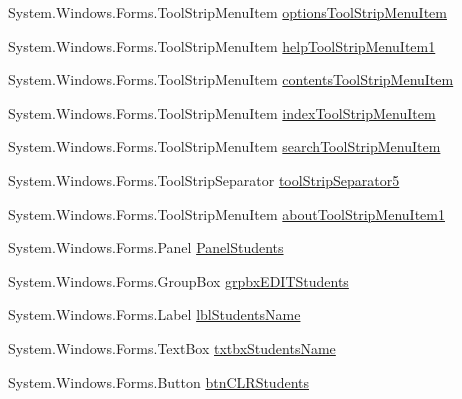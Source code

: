 \begin{DoxyCompactItemize}
\item 
\-System.\-Windows.\-Forms.\-Tool\-Strip\-Menu\-Item \hyperlink{class_sr_p___classroom_inq_1_1frm_classrrom_inq_acdc1111ba8acc3bb1ee140845f069521}{options\-Tool\-Strip\-Menu\-Item}
\item 
\-System.\-Windows.\-Forms.\-Tool\-Strip\-Menu\-Item \hyperlink{class_sr_p___classroom_inq_1_1frm_classrrom_inq_a09bf82e0de8e7288e39988c7bfc5f5e7}{help\-Tool\-Strip\-Menu\-Item1}
\item 
\-System.\-Windows.\-Forms.\-Tool\-Strip\-Menu\-Item \hyperlink{class_sr_p___classroom_inq_1_1frm_classrrom_inq_ac8e6b07efe8b6fe7e1a82d326648f88e}{contents\-Tool\-Strip\-Menu\-Item}
\item 
\-System.\-Windows.\-Forms.\-Tool\-Strip\-Menu\-Item \hyperlink{class_sr_p___classroom_inq_1_1frm_classrrom_inq_a650650a8a1948b902bae347f3cdf9679}{index\-Tool\-Strip\-Menu\-Item}
\item 
\-System.\-Windows.\-Forms.\-Tool\-Strip\-Menu\-Item \hyperlink{class_sr_p___classroom_inq_1_1frm_classrrom_inq_aa54fbd91dddb42716ec00341ee7ac713}{search\-Tool\-Strip\-Menu\-Item}
\item 
\-System.\-Windows.\-Forms.\-Tool\-Strip\-Separator \hyperlink{class_sr_p___classroom_inq_1_1frm_classrrom_inq_ae8424b2612bda51525d313c05df65bb0}{tool\-Strip\-Separator5}
\item 
\-System.\-Windows.\-Forms.\-Tool\-Strip\-Menu\-Item \hyperlink{class_sr_p___classroom_inq_1_1frm_classrrom_inq_ab34838f16ac4c613949fc6e6b18e972d}{about\-Tool\-Strip\-Menu\-Item1}
\item 
\-System.\-Windows.\-Forms.\-Panel \hyperlink{class_sr_p___classroom_inq_1_1frm_classrrom_inq_a70fa7dcce9d5cbc3564066532704c216}{\-Panel\-Students}
\item 
\-System.\-Windows.\-Forms.\-Group\-Box \hyperlink{class_sr_p___classroom_inq_1_1frm_classrrom_inq_a934cec75a0d91eca5ca9786b078462a3}{grpbx\-E\-D\-I\-T\-Students}
\item 
\-System.\-Windows.\-Forms.\-Label \hyperlink{class_sr_p___classroom_inq_1_1frm_classrrom_inq_ac87221e35b87aece56933aba4e90d11e}{lbl\-Students\-Name}
\item 
\-System.\-Windows.\-Forms.\-Text\-Box \hyperlink{class_sr_p___classroom_inq_1_1frm_classrrom_inq_ad797f7d682d2f40b509b4904fac76461}{txtbx\-Students\-Name}
\item 
\-System.\-Windows.\-Forms.\-Button \hyperlink{class_sr_p___classroom_inq_1_1frm_classrrom_inq_ad2bdef2e6f826a27d003c1a0df8bd2be}{btn\-C\-L\-R\-Students}
\item 

\end{DoxyCompactItemize}
